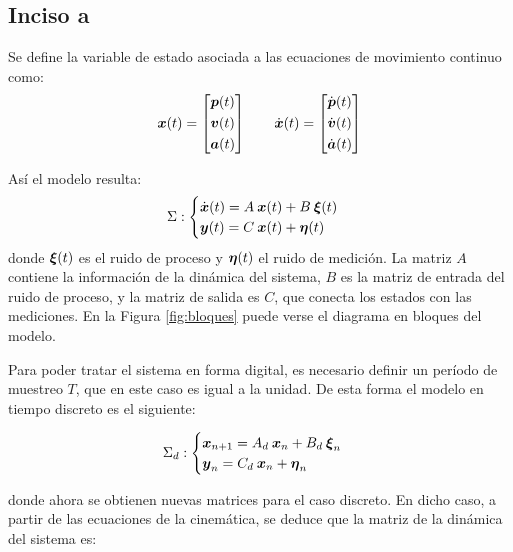 \subsection{Inciso a}
	Se define la variable de estado asociada a las ecuaciones de movimiento continuo como:
		\begin{equation*}
			\vect{x}(t) = \begin{bmatrix} \vect{p}(t) \\[0.3em] \vect{v}(t) \\[0.3em] \vect{a}(t) \end{bmatrix} \qquad%
			\dot{\vect{x}}(t) = \begin{bmatrix} \dot{\vect{p}}(t) \\[0.3em] \dot{\vect{v}}(t) \\[0.3em] \dot{\vect{a}}(t) \end{bmatrix}
		\end{equation*}

	Así el modelo resulta:
		\begin{equation*}
			\Sigma:
			\begin{cases}
				\dot{\boldsymbol{x}}(t) = A\: \boldsymbol{x}(t) + B \: \boldsymbol{\xi}(t) \\
				\boldsymbol{y}(t) = C\: \boldsymbol{x}(t) + \boldsymbol{\eta}(t)
			\end{cases}
		\end{equation*}
	donde $\boldsymbol{\xi}(t)$ es el ruido de proceso y $\boldsymbol{\eta}(t)$ el ruido de medición. La matriz $A$ contiene la información de la dinámica del sistema, $B$ es la matriz de entrada del ruido de proceso, y la matriz de salida es $C$, que conecta los estados con las mediciones. En la Figura \ref{fig:bloques} puede verse el diagrama en bloques del modelo.
	
	Para poder tratar el sistema en forma digital, es necesario definir un período de muestreo $T$, que en este caso es igual a la unidad. De esta forma el modelo en tiempo discreto es el siguiente:
	
		\begin{equation*}
			\Sigma_{d}:
			\begin{cases}
				\boldsymbol{x}_{n + 1} = A_{d}\: \boldsymbol{x}_{n} + B_{d} \: \boldsymbol{\xi}_{n} \\
				\boldsymbol{y}_{n} = C_{d}\: \boldsymbol{x}_{n} + \boldsymbol{\eta}_{n}
			\end{cases}
		\end{equation*}
		
	donde ahora se obtienen nuevas matrices para el caso discreto. En dicho caso, a partir de las ecuaciones de la cinemática, se deduce que la matriz de la dinámica del sistema es:


